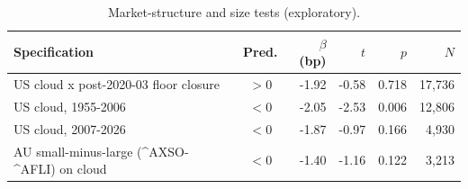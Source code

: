 \begin{table}[htbp]\centering\footnotesize
\caption{Market-structure and size tests (exploratory).}
\label{tab:robust_structure}
\begin{tabular}{lcrrrr}\toprule
Specification & Pred. & $\beta$ (bp) & $t$ & $p$ & $N$ \\ \midrule
US cloud x post-2020-03 floor closure & $>$0 & -1.92 & -0.58 & 0.718 & 17,736 \\
US cloud, 1955-2006 & $<$0 & -2.05 & -2.53 & 0.006 & 12,806 \\
US cloud, 2007-2026 & $<$0 & -1.87 & -0.97 & 0.166 & 4,930 \\
AU small-minus-large (\^{}AXSO-\^{}AFLI) on cloud & $<$0 & -1.40 & -1.16 & 0.122 & 3,213 \\
\bottomrule\end{tabular}\end{table}

